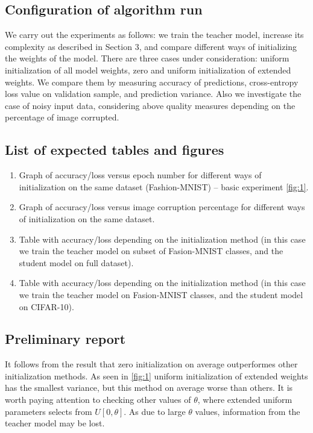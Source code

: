 \documentclass[80pt]{article}
\begin{document}
\subsection{Configuration of algorithm run}

We carry out the experiments as follows: we train the teacher model, increase its complexity as described in Section 3, and compare different ways of initializing the weights of the model. There are three cases under consideration: uniform initialization of all model weights, zero and uniform initialization of extended weights. We compare them by measuring accuracy of predictions, cross-entropy loss value on validation sample, and prediction variance. Also we investigate the case of noisy input data, considering above quality measures depending on the percentage of image corrupted.

\subsection{List of expected tables and figures}

\begin{enumerate}
    \item Graph of accuracy/loss versus epoch number for different ways of initialization on the same dataset (Fashion-MNIST) -- basic experiment \ref{fig:1}.
    \item Graph of accuracy/loss versus image corruption percentage for different ways of initialization on the same dataset.
    \item Table with accuracy/loss depending on the initialization method (in this case we train the teacher model on subset of Fasion-MNIST classes, and the student model on full dataset).
    \item Table with accuracy/loss depending on the initialization method (in this case we train the teacher model on Fasion-MNIST classes, and the student model on CIFAR-10).
\end{enumerate}

\subsection{Preliminary report}

It follows from the result that zero initialization on average outperformes other initialization methods. As seen in \ref{fig:1} uniform initialization of extended weights has the smallest variance, but this method on average worse than others. It is worth paying attention to checking other values of $\theta$, where extended uniform parameters selects from $U[0, \theta]$. As due to large $\theta$ values, information from the teacher model may be lost.
\end{document}
